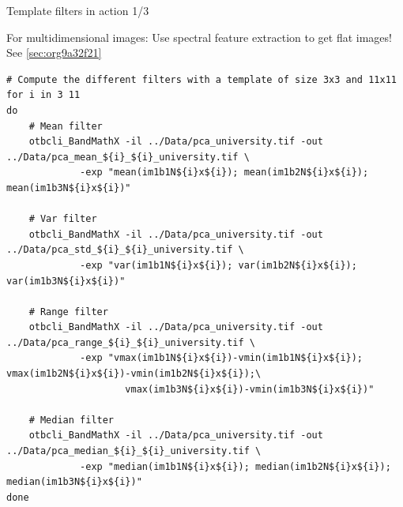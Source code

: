 \documentclass[10pt,aspectratio=1610]{beamer}
\begin{document}
\begin{frame}[fragile,label={sec:org7a91296}]{Template filters in action 1/3}
 \begin{center}
\alert{For multidimensional images: Use spectral feature extraction to get flat images!} See \ref{sec:org9a32f21}
\end{center}

\begin{verbatim}
# Compute the different filters with a template of size 3x3 and 11x11
for i in 3 11
do
    # Mean filter
    otbcli_BandMathX -il ../Data/pca_university.tif -out ../Data/pca_mean_${i}_${i}_university.tif \
		     -exp "mean(im1b1N${i}x${i}); mean(im1b2N${i}x${i}); mean(im1b3N${i}x${i})"

    # Var filter
    otbcli_BandMathX -il ../Data/pca_university.tif -out ../Data/pca_std_${i}_${i}_university.tif \
		     -exp "var(im1b1N${i}x${i}); var(im1b2N${i}x${i}); var(im1b3N${i}x${i})"

    # Range filter
    otbcli_BandMathX -il ../Data/pca_university.tif -out ../Data/pca_range_${i}_${i}_university.tif \
		     -exp "vmax(im1b1N${i}x${i})-vmin(im1b1N${i}x${i}); vmax(im1b2N${i}x${i})-vmin(im1b2N${i}x${i});\
                     vmax(im1b3N${i}x${i})-vmin(im1b3N${i}x${i})"

    # Median filter
    otbcli_BandMathX -il ../Data/pca_university.tif -out ../Data/pca_median_${i}_${i}_university.tif \
		     -exp "median(im1b1N${i}x${i}); median(im1b2N${i}x${i}); median(im1b3N${i}x${i})"
done
\end{verbatim}
\end{frame}
\end{document}
